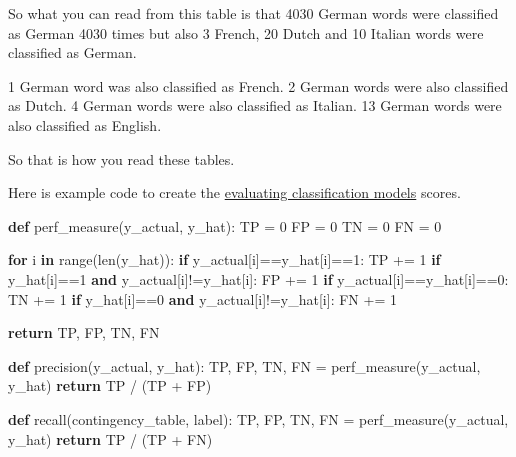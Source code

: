 \documentclass[
  11pt,
  british,
]{article}
\newenvironment{Shaded}{}{}
\newcommand{\BuiltInTok}[1]{#1}
\newcommand{\ControlFlowTok}[1]{\textcolor[rgb]{0.00,0.44,0.13}{\textbf{#1}}}
\newcommand{\DecValTok}[1]{\textcolor[rgb]{0.25,0.63,0.44}{#1}}
\newcommand{\KeywordTok}[1]{\textcolor[rgb]{0.00,0.44,0.13}{\textbf{#1}}}
\newcommand{\NormalTok}[1]{#1}
\newcommand{\OperatorTok}[1]{\textcolor[rgb]{0.40,0.40,0.40}{#1}}
\begin{document}
So what you can read from this table is that 4030 German words were
classified as German 4030 times but also 3 French, 20 Dutch and 10
Italian words were classified as German.

1 German word was also classified as French. 2 German words were also
classified as Dutch. 4 German words were also classified as Italian. 13
German words were also classified as English.

So that is how you read these tables.

Here is example code to create the
\href{Evaluating\%20Classification\%20models.md}{evaluating
classification models} scores.

\begin{Shaded}
\begin{Highlighting}[]
\KeywordTok{def}\NormalTok{ perf\_measure(y\_actual, y\_hat):}
\NormalTok{    TP }\OperatorTok{=} \DecValTok{0}
\NormalTok{    FP }\OperatorTok{=} \DecValTok{0}
\NormalTok{    TN }\OperatorTok{=} \DecValTok{0}
\NormalTok{    FN }\OperatorTok{=} \DecValTok{0}

    \ControlFlowTok{for}\NormalTok{ i }\KeywordTok{in} \BuiltInTok{range}\NormalTok{(}\BuiltInTok{len}\NormalTok{(y\_hat)): }
        \ControlFlowTok{if}\NormalTok{ y\_actual[i]}\OperatorTok{==}\NormalTok{y\_hat[i]}\OperatorTok{==}\DecValTok{1}\NormalTok{:}
\NormalTok{           TP }\OperatorTok{+=} \DecValTok{1}
        \ControlFlowTok{if}\NormalTok{ y\_hat[i]}\OperatorTok{==}\DecValTok{1} \KeywordTok{and}\NormalTok{ y\_actual[i]}\OperatorTok{!=}\NormalTok{y\_hat[i]:}
\NormalTok{           FP }\OperatorTok{+=} \DecValTok{1}
        \ControlFlowTok{if}\NormalTok{ y\_actual[i]}\OperatorTok{==}\NormalTok{y\_hat[i]}\OperatorTok{==}\DecValTok{0}\NormalTok{:}
\NormalTok{           TN }\OperatorTok{+=} \DecValTok{1}
        \ControlFlowTok{if}\NormalTok{ y\_hat[i]}\OperatorTok{==}\DecValTok{0} \KeywordTok{and}\NormalTok{ y\_actual[i]}\OperatorTok{!=}\NormalTok{y\_hat[i]:}
\NormalTok{           FN }\OperatorTok{+=} \DecValTok{1}

    \ControlFlowTok{return}\NormalTok{ TP, FP, TN, FN}

\KeywordTok{def}\NormalTok{ precision(y\_actual, y\_hat):}
\NormalTok{    TP, FP, TN, FN }\OperatorTok{=}\NormalTok{ perf\_measure(y\_actual, y\_hat)}
    \ControlFlowTok{return}\NormalTok{ TP }\OperatorTok{/}\NormalTok{ (TP }\OperatorTok{+}\NormalTok{ FP)}


\KeywordTok{def}\NormalTok{ recall(contingency\_table, label):}
\NormalTok{    TP, FP, TN, FN }\OperatorTok{=}\NormalTok{ perf\_measure(y\_actual, y\_hat)}
    \ControlFlowTok{return}\NormalTok{ TP }\OperatorTok{/}\NormalTok{ (TP }\OperatorTok{+}\NormalTok{ FN)}


\end{Highlighting}
\end{Shaded}
\end{document}
